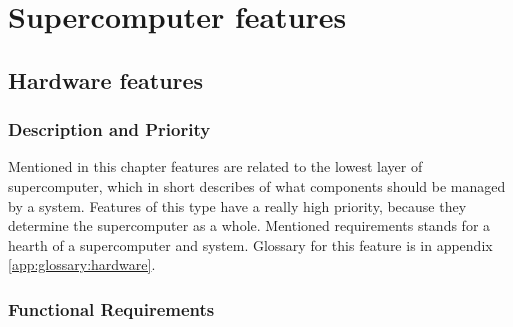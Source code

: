 \documentclass{report}
\begin{document}
\chapter{Supercomputer features} \label{chp:sc}
\section{Hardware features}

\subsection{Description and Priority}

Mentioned in this chapter features are related to the lowest layer of supercomputer, which in short describes of what components should be managed by a system. Features of this type have a really high priority, because they determine the supercomputer as a whole. Mentioned requirements stands for a hearth of a supercomputer and system. Glossary for this feature is in appendix \ref{app:glossary:hardware}.


\subsection{Functional Requirements}
\end{document}
